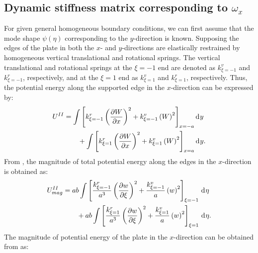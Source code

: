 \documentclass[preprint,12pt]{elsarticle}
\newcommand{\id}{\mathrm{d}\mkern1mu}
\begin{document}
\subsection{Dynamic stiffness matrix corresponding to $\omega_x$}\label{sec:DSMx}
For given general homogeneous boundary conditions, we can first assume that the mode shape $\psi(\eta)$ corresponding to the $y$-direction is known. 
Supposing the edges of the plate in both the $x$- and $y$-directions are elastically restrained by homogeneous vertical translational and rotational springs.
The vertical translational and rotational springs at the $\xi = -1$ end are denoted as $k^v_{\xi = -1}$ and $k^r_{\xi = -1}$, respectively, and at the $\xi = 1$ end as $k^v_{\xi = 1}$ and $k^r_{\xi = 1}$, respectively. 
Thus, the potential energy along the supported edge in the $x$-direction can be expressed by:
%
\begin{equation}\label{eq:poten_energy_edgex}
	\begin{split}
		U^{II} &=  \int\left[k^r_{\xi=-1} \left( \frac{\partial W}{\partial x} \right)^2 + k^v_{\xi=-1} \left( W \right)^2\right]_{x=-a} \id y\\
		&\qquad +  \int\left[k^r_{\xi=1} \left( \frac{\partial W}{\partial x} \right)^2 + k^v_{\xi=1} \left( W \right)^2\right]_{x=a} \id y.
	\end{split}
\end{equation}
%
From , the magnitude of total potential energy along the edges in the $x$-direction is obtained as:
%
\begin{equation}\label{eq:poten_energy_edgex2}
	\begin{split}
		U^{II}_{mag} &= ab \int\left[\frac{k^r_{\xi=-1}}{a^3} \left( \frac{\partial w}{\partial \xi} \right)^2 + \frac{k^v_{\xi=-1}}{a} \left( w \right)^2\right]_{\xi=-1} \, \id \eta \\
		&\qquad + ab \int\left[\frac{k^r_{\xi=1}}{a^3} \left( \frac{\partial w}{\partial \xi} \right)^2 + \frac{k^v_{\xi=1}}{a} \left( w \right)^2\right]_{\xi=1} \, \id \eta.
	\end{split}
\end{equation}
%
The magnitude of potential energy of the plate in the $x$-direction can be obtained from  as:
\end{document}

